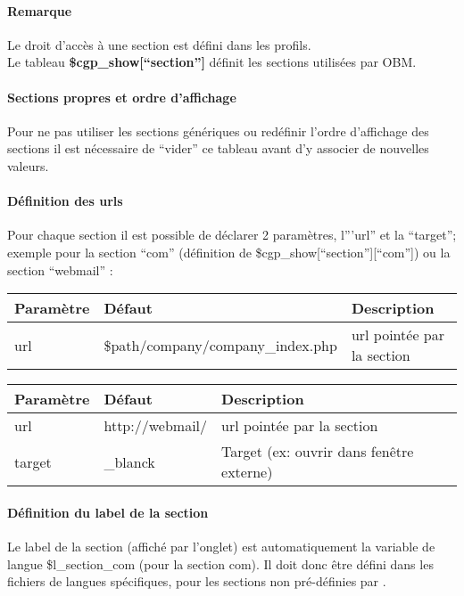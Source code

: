 \paragraph{Remarque} Le droit d'accès à une section est défini dans les profils.\\

Le tableau \textbf{\$cgp\_show[``section'']} définit les sections utilisées par OBM.

\paragraph{Sections propres et ordre d'affichage}

Pour ne pas utiliser les sections génériques ou redéfinir l'ordre d'affichage des sections il est nécessaire de ``vider'' ce tableau avant d'y associer de nouvelles valeurs.
 
\paragraph{Définition des urls}

Pour chaque section il est possible de déclarer 2 paramètres, l'''url'' et la ``target''; exemple pour la section ``com'' (définition de \$cgp\_show[``section''][``com'']) ou la section ``webmail'' :\\

\begin{tabular}{|p{2.5cm}|p{5.5cm}|p{5cm}|}
\hline
\textbf{Paramètre} & \textbf{Défaut} & \textbf{Description} \\
\hline
url & \$path/company/company\_index.php & url pointée par la section \\ 
\hline
\end{tabular}

\begin{tabular}{|p{2.5cm}|p{5.5cm}|p{5cm}|}
\hline
\textbf{Paramètre} & \textbf{Défaut} & \textbf{Description} \\
\hline
url & http://webmail/ & url pointée par la section \\ 
\hline
target & \_blanck & Target (ex: ouvrir dans fenêtre externe) \\ 
\hline
\end{tabular}

\paragraph{Définition du label de la section}
Le label de la section (affiché par l'onglet) est automatiquement la variable de langue \$l\_section\_com (pour la section com).
Il doit donc être défini dans les fichiers de langues spécifiques, pour les sections non pré-définies par \obm.

